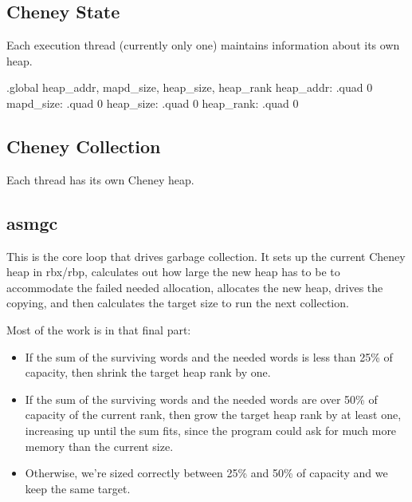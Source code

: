 \subsection{Cheney State}

Each execution thread (currently only one) maintains information about its own
heap.

\begin{asmdata}
.global heap_addr, mapd_size, heap_size, heap_rank
heap_addr:	.quad 0
mapd_size:	.quad 0
heap_size:	.quad 0
heap_rank:	.quad 0
\end{asmdata}

\subsection{Cheney Collection}

Each thread has its own Cheney heap.

\subsection{asmgc}

This is the core loop that drives garbage collection. It sets up the current
Cheney heap in rbx/rbp, calculates out how large the new heap has to be to
accommodate the failed needed allocation, allocates the new heap, drives the
copying, and then calculates the target size to run the next collection.

Most of the work is in that final part:

\begin{itemize}
\item
If the sum of the surviving words and the needed words is less than 25\% of
capacity, then shrink the target heap rank by one.
\item
If the sum of the surviving words and the needed words are over 50\% of
capacity of the current rank, then grow the target heap rank by at least one,
increasing up until the sum fits, since the program could ask for much more
memory than the current size.
\item
Otherwise, we're sized correctly between 25\% and 50\% of capacity and we keep
the same target.
\end{itemize}

